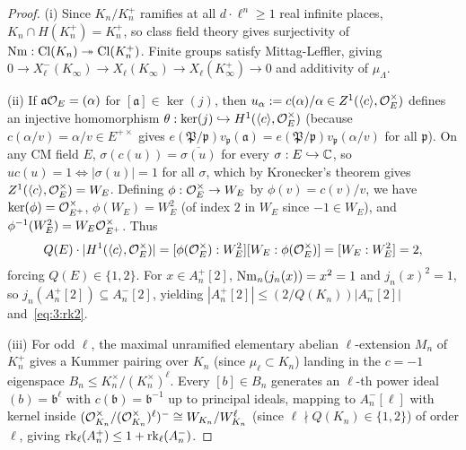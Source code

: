 \begin{proof}
(i) Since $K_n / K_n^+$ ramifies at all $d\cdot \ell^n \ge 1$ real infinite places, $K_n \cap H(K_n^+) = K_n^+$, so class field theory gives surjectivity of $\operatorname{Nm} : \mathrm{Cl}(K_n) \twoheadrightarrow \mathrm{Cl}(K_n^+)$. Finite groups satisfy Mittag-Leffler, giving $0 \to X_\ell^-(K_\infty) \to X_\ell(K_\infty) \to X_\ell(K_{\infty}^+) \to 0$ and additivity of $\mu_\Lambda$.

(ii) If $\mathfrak{a}\mathcal{O}_E = (\alpha)$ for $[\mathfrak{a}] \in \ker(j)$, then $u_\alpha := c(\alpha)/\alpha \in Z^1(\langle c \rangle, \mathcal{O}_E^\times)$ defines an injective homomorphism $\theta : \ker(j) \hookrightarrow H^1(\langle c \rangle, \mathcal{O}_E^\times)$ (because $c(\alpha/v) = \alpha/v \in E^{+\times}$ gives $e(\mathfrak{P}/\mathfrak{p})v_{\mathfrak{p}}(\mathfrak{a}) = e(\mathfrak{P}/\mathfrak{p})v_{\mathfrak{p}}(\alpha/v)$ for all $\mathfrak{p}$). On any CM field $E$, $\sigma(c(u)) = \overline{\sigma(u)}$ for every $\sigma : E \hookrightarrow \mathbb{C}$, so $u c(u) = 1 \iff |\sigma(u)| = 1$ for all $\sigma$, which by Kronecker's theorem gives $Z^1(\langle c \rangle, \mathcal{O}_E^\times) = W_E$. Defining $\phi : \mathcal{O}_E^\times \to W_E$ by $\phi(v) = c(v)/v$, we have $\ker(\phi) = \mathcal{O}_{E^+}^\times$, $\phi(W_E) = W_E^2$ (of index $2$ in $W_E$ since $-1 \in W_E$), and $\phi^{-1}(W_E^2) = W_E \mathcal{O}_{E^+}^\times$. Thus
\[
  Q(E)\cdot |H^1(\langle c \rangle, \mathcal{O}_E^\times)| = [\phi(\mathcal{O}_E^\times) : W_E^2][W_E : \phi(\mathcal{O}_E^\times)] = [W_E : W_E^2] = 2,
\]
forcing $Q(E) \in \{1, 2\}$. For $x \in A_n^+[2]$, $\operatorname{Nm}_n(j_n(x)) = x^2 = 1$ and $j_n(x)^2 = 1$, so $j_n(A_n^+[2]) \subseteq A_n^-[2]$, yielding $|A_n^+[2]| \le (2/Q(K_n))|A_n^-[2]|$ and~\eqref{eq:3:rk2}.

(iii) For odd $\ell$, the maximal unramified elementary abelian $\ell$-extension $M_n$ of $K_n^+$ gives a Kummer pairing over $K_n$ (since $\mu_\ell \subset K_n$) landing in the $c = -1$ eigenspace $B_n \le K_n^\times/(K_n^\times)^\ell$. Every $[b] \in B_n$ generates an $\ell$-th power ideal $(b) = \mathfrak{b}^\ell$ with $c(\mathfrak{b}) = \mathfrak{b}^{-1}$ up to principal ideals, mapping to $A_n^-[\ell]$ with kernel inside $(\mathcal{O}_{K_n}^\times/(\mathcal{O}_{K_n}^\times)^\ell)^- \cong W_{K_n}/W_{K_n}^\ell$ (since $\ell \nmid Q(K_n) \in \{1,2\}$) of order $\ell$, giving $\operatorname{rk}_\ell(A_n^+) \le 1 + \operatorname{rk}_\ell(A_n^-)$.


\end{proof}
